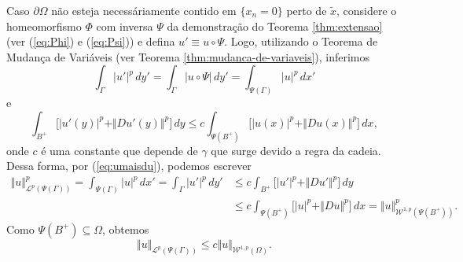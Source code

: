 \documentclass[a4paper, 11pt]{book}
\theoremstyle{definition}
\newcommand{\cL}{\mathcal{L}}
\newcommand{\cW}{\mathcal{W}}
\begin{document}
\begin{prf}
\begin{figure}
        \caption{}
        \label{fig:tracos}
    \end{figure}

    Caso $\partial \Omega$ não esteja necessáriamente contido em $\{x_n =0 \}$ perto de $\tilde x$, considere o homeomorfismo $\Phi$  com inversa $\Psi$ da demonstração do Teorema \ref{thm:extensao} (ver (\ref{eq:Phi}) e (\ref{eq:Psi})) e defina $u' \equiv u \circ \Psi$. Logo, utilizando o Teorema de Mudança de Variáveis (ver Teorema \ref{thm:mudanca-de-variaveis}), inferimos
    \[
        \int_\Gamma |u'|^p \,dy' = \int_\Gamma |u \circ \Psi| \, dy' = \int_{\Psi(\Gamma)} |u|^p \,dx'
    \]
    e
    \[
        \int_{B^+} \big[ |u'(y)|^p + \Vert Du'(y) \Vert^p \big] \,dy \leqslant c\int_{\Psi(B^+)} \big[ |u(x)|^p + \Vert Du(x) \Vert^p \big] \,dx,
    \]
    onde $c$ é uma constante que depende de $\gamma$ que surge devido a regra da cadeia. Dessa forma, por (\ref{eq:umaisdu}), podemos escrever
    \[
        \begin{aligned}
            \Vert u \Vert^p_{\cL^p(\Psi(\Gamma))} = \int_{\Psi(\Gamma)} |u|^p \,dx' = \int_{\Gamma} |u'|^p \,dy' &\leqslant c\int_{B^+} \big[ |u'|^p + \Vert Du' \Vert^p \big]\,dy\\ 
            &\leqslant c \int_{\Psi(B^+)} \big[ |u|^p + \Vert Du \Vert^p \big] \,dx = \Vert u \Vert_{\cW^{1,p}(\Psi(B^+))}^p.
        \end{aligned}
    \]
    Como $\Psi(B^+) \subseteq \Omega$, obtemos 
    \[
        \Vert u \Vert_{\cL^p(\Psi(\Gamma))} \leqslant c \Vert u \Vert_{\cW^{1,p}(\Omega)}.
    \]


\end{prf}
\end{document}
